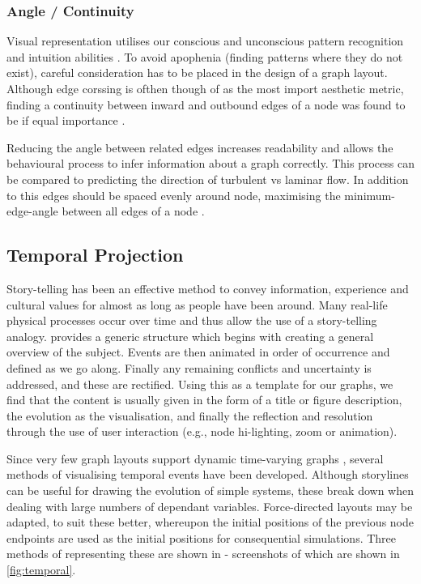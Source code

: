 \subsubsection{ Angle / Continuity}
Visual representation utilises our conscious and unconscious pattern recognition and intuition abilities \citep{pattern}. To avoid apophenia (finding patterns where they do not exist), careful  consideration has to be placed in the design of a graph layout. 
Although edge corssing is ofthen though of as the most import aesthetic metric, finding a continuity between inward and outbound edges of a node was found to be if equal importance \citep{continuity}.

Reducing the angle between related edges increases readability and allows the behavioural process to infer information about a graph correctly. This process can be compared to predicting the direction of turbulent vs laminar flow. In addition to this edges should be spaced evenly around node, maximising the minimum-edge-angle between all edges of a node \citep{aestheticsgraphvis}. 



\subsection{Temporal Projection}
Story-telling has been an effective method to convey information, experience and cultural values for almost as long as people have been around. Many real-life physical processes occur over time and thus allow the use of a story-telling analogy. \cite{storytelling} provides a generic structure which begins with creating a general overview of the subject. Events are then animated in order of occurrence and defined as we go along. Finally any remaining conflicts and uncertainty is addressed, and these are rectified.  
Using this as a template for our graphs, we find that the content is usually given in the form of a title or figure description, the evolution as the visualisation, and finally the reflection and resolution through the use of user interaction (e.g., node hi-lighting, zoom or animation).

Since very few graph layouts support dynamic time-varying graphs \citep{tvg}, several methods of visualising temporal events have been developed. 
Although storylines can be useful for drawing the evolution of simple systems, these break down when dealing with large numbers of dependant variables. Force-directed layouts may be adapted, to suit these better, whereupon the initial positions of the previous node endpoints are used as the initial positions for consequential simulations. Three methods of representing these are shown in \citep{daygraph} - screenshots of which are shown in \autoref{fig:temporal}.


